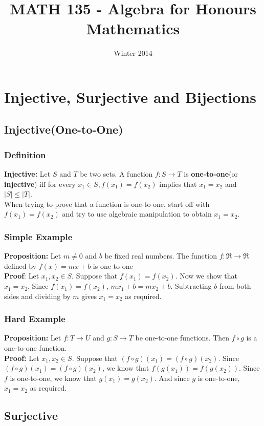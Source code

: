 \documentclass[12pt]{report}
\title{MATH 135 - Algebra for Honours Mathematics}
\author{}
\date{Winter 2014}
\begin{document}
\maketitle
\tableofcontents

\chapter{Injective, Surjective and Bijections}
	\section{Injective(One-to-One)}
		\subsection{Definition}
			\textbf{Injective:} Let $S$ and $T$ be two sets. A function $f: S \rightarrow T$ is \textbf{one-to-one}(or \textbf{injective}) iff for every $x_1 \in S, f(x_1) = f(x_2)$ implies that $x_1 = x_2$ and $|S| \leq |T|$. \\
			When trying to prove that a function is one-to-one, start off with $f(x_1) = f(x_2)$ and try to use algebraic manipulation to obtain $x_1 = x_2$. 
		\subsection{Simple Example}
			\textbf{Proposition:} Let $m \neq 0$ and $b$ be fixed real numbers. The function $f: \Re \rightarrow \Re$ defined by $f(x) = mx + b$ is one to one\\
			\textbf{Proof}: Let $x_1, x_2 \in S$. Suppose that $f(x_1) = f(x_2)$. Now we show that $x_1 = x_2$. Since $f(x_1) = f(x_2)$, $mx_1 + b = mx_2 + b$. Subtracting $b$ from both sides and dividing by $m$ gives $x_1 = x_2$ as required.
		\subsection{Hard Example}
			\textbf{Proposition:} Let $f: T \rightarrow U$ and $g:S \rightarrow T$ be one-to-one functions. Then $f \circ g$ is a one-to-one function.\\
			\textbf{Proof:} Let $x_1, x_2 \in S$. Suppose that $(f \circ g)(x_1) = (f \circ g)(x_2)$. Since $(f \circ g)(x_1) = (f \circ g)(x_2)$, we know that $f(g(x_1)) = f(g(x_2))$. Since $f$ is one-to-one, we know that $g(x_1) = g(x_2)$. And since $g$ is one-to-one, $x_1 = x_2$ as required. 

	\section{Surjective}
\end{document}
